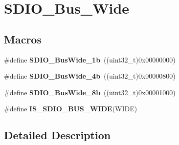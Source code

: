 \hypertarget{group___s_d_i_o___bus___wide}{\section{S\-D\-I\-O\-\_\-\-Bus\-\_\-\-Wide}
\label{group___s_d_i_o___bus___wide}
}
\subsection*{Macros}
\begin{DoxyCompactItemize}
\item 
\hypertarget{group___s_d_i_o___bus___wide_ga9c333b57937c5cc0a173a58519f9250a}{\#define {\bfseries S\-D\-I\-O\-\_\-\-Bus\-Wide\-\_\-1b}~((uint32\-\_\-t)0x00000000)}\label{group___s_d_i_o___bus___wide_ga9c333b57937c5cc0a173a58519f9250a}

\item 
\hypertarget{group___s_d_i_o___bus___wide_ga79815d1d798b28a2d3750ad25466ff1b}{\#define {\bfseries S\-D\-I\-O\-\_\-\-Bus\-Wide\-\_\-4b}~((uint32\-\_\-t)0x00000800)}\label{group___s_d_i_o___bus___wide_ga79815d1d798b28a2d3750ad25466ff1b}

\item 
\hypertarget{group___s_d_i_o___bus___wide_ga4d864f5c4e1af298146afc1d680081e9}{\#define {\bfseries S\-D\-I\-O\-\_\-\-Bus\-Wide\-\_\-8b}~((uint32\-\_\-t)0x00001000)}\label{group___s_d_i_o___bus___wide_ga4d864f5c4e1af298146afc1d680081e9}

\item 
\#define {\bfseries I\-S\-\_\-\-S\-D\-I\-O\-\_\-\-B\-U\-S\-\_\-\-W\-I\-D\-E}(W\-I\-D\-E)
\end{DoxyCompactItemize}


\subsection{Detailed Description}


